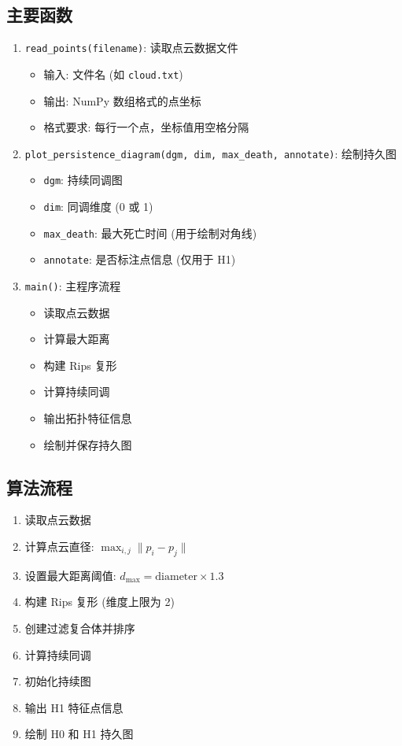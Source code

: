 \documentclass[a4paper]{article}
\begin{document}
\subsection{主要函数}
\begin{enumerate}
    \item \texttt{read\_points(filename)}: 读取点云数据文件
    
    \begin{itemize}
        \item 输入: 文件名 (如 \texttt{cloud.txt})
        \item 输出: NumPy 数组格式的点坐标
        \item 格式要求: 每行一个点，坐标值用空格分隔
    \end{itemize}

    \item \texttt{plot\_persistence\_diagram(dgm, dim, max\_death, annotate)}: 绘制持久图
    
    \begin{itemize}
        \item \texttt{dgm}: 持续同调图
        \item \texttt{dim}: 同调维度 (0 或 1)
        \item \texttt{max\_death}: 最大死亡时间 (用于绘制对角线)
        \item \texttt{annotate}: 是否标注点信息 (仅用于 H1)
    \end{itemize}

    \item \texttt{main()}: 主程序流程
    
    \begin{itemize}
        \item 读取点云数据
        \item 计算最大距离
        \item 构建 Rips 复形
        \item 计算持续同调
        \item 输出拓扑特征信息
        \item 绘制并保存持久图
    \end{itemize}
\end{enumerate}

\subsection{算法流程}
\begin{enumerate}
    \item 读取点云数据
    \item 计算点云直径: $\max_{i,j} \|p_i - p_j\|$
    \item 设置最大距离阈值: $d_{\max} = \text{diameter} \times 1.3$
    \item 构建 Rips 复形 (维度上限为 2)
    \item 创建过滤复合体并排序
    \item 计算持续同调
    \item 初始化持续图
    \item 输出 H1 特征点信息
    \item 绘制 H0 和 H1 持久图
\end{enumerate}
\end{document}
